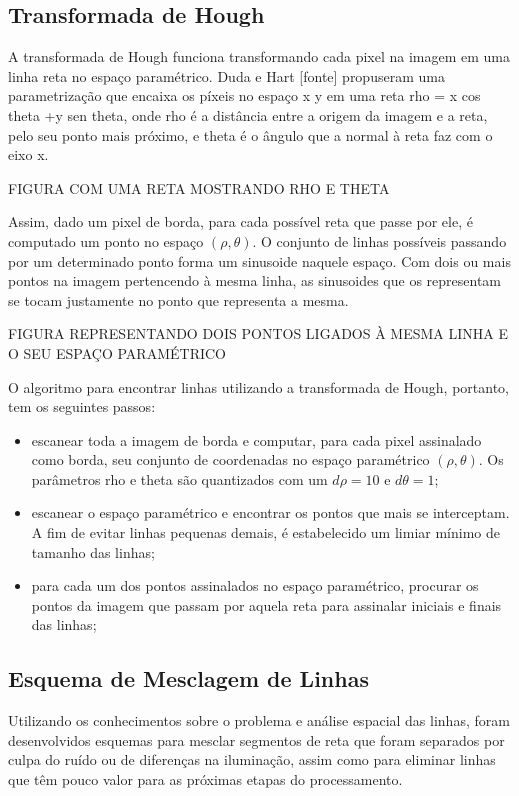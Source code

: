 \subsection{Transformada de Hough}

A transformada de Hough funciona transformando cada pixel na imagem em uma linha reta no espaço paramétrico. Duda e Hart [fonte] propuseram uma parametrização que encaixa os píxeis no espaço x y em uma reta rho = x cos theta +y sen theta, onde rho é a distância entre a origem da imagem e a reta, pelo seu ponto mais próximo, e theta é o ângulo que a normal à reta faz com o eixo x.

FIGURA COM UMA RETA MOSTRANDO RHO E THETA

Assim, dado um pixel de borda, para cada possível reta que passe por ele, é computado um ponto no espaço $(\rho,\theta)$. O conjunto de linhas possíveis passando por um determinado ponto forma um sinusoide naquele espaço. Com dois ou mais pontos na imagem pertencendo à mesma linha, as sinusoides que os representam se tocam justamente no ponto que representa a mesma.

FIGURA REPRESENTANDO DOIS PONTOS LIGADOS À MESMA LINHA E O SEU ESPAÇO PARAMÉTRICO

O algoritmo para encontrar linhas utilizando a transformada de Hough, portanto, tem os seguintes passos: 
\begin{itemize}
\item escanear toda a imagem de borda e computar, para cada pixel assinalado como borda, seu conjunto de coordenadas no espaço paramétrico $(\rho,\theta)$. Os parâmetros rho e theta são quantizados com um $d\rho = 10$ e $d\theta = 1$;
\item escanear o espaço paramétrico e encontrar os pontos que mais se interceptam. A fim de evitar linhas pequenas demais, é estabelecido um limiar mínimo de tamanho das linhas;
\item para cada um dos pontos assinalados no espaço paramétrico, procurar os pontos da imagem que passam por aquela reta para assinalar iniciais e finais das linhas;
\end{itemize}

\subsection{Esquema de Mesclagem de Linhas}

Utilizando os conhecimentos sobre o problema e análise espacial das linhas, foram desenvolvidos esquemas para mesclar segmentos de reta que foram separados por culpa do ruído ou de diferenças na iluminação, assim como para eliminar linhas que têm pouco valor para as próximas etapas do processamento.

